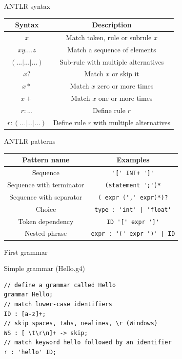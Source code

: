 \documentclass{beamer}
\begin{document}
\begin{frame}{ANTLR syntax}
	\begin{table}[H]
		\begin{tabular}{c|c}
			\textbf{Syntax} & \textbf{Description} \\
			\hline
			$x$ & Match token, rule or subrule $x$ \\
			$x y ....z$ & Match a sequence of elements \\
			$(...|...|...)$ & Sub-rule with multiple alternatives \\
			$x?$ & Match $x$ or skip it \\
			$x*$ & Match $x$ zero or more times \\
			$x+$ & Match $x$ one or more times \\
			$r: ...$ & Define rule $r$ \\
			$r: (...|...|...)$ & Define rule $r$ with multiple alternatives
		\end{tabular}
	\end{table}
\end{frame}

\begin{frame}[fragile]{ANTLR patterns}
	\begin{table}[H]
		\begin{tabular}{c|c}
			\textbf{Pattern name} & \textbf{Examples} \\
			\hline
			Sequence & \verb|'[' INT+ ']'|\\
			Sequence with terminator & \verb|(statement ';')*| \\
			Sequence with separator & \verb|( expr (',' expr)*)?| \\
			Choice & \verb^type : 'int' | 'float'^\\
			Token dependency & \verb|ID '[' expr ']'| \\
			Nested phrase & \verb^expr : '(' expr ')' | ID^
		\end{tabular}
	\end{table}
\end{frame}

\begin{frame}[fragile]{First grammar}
	\begin{exampleblock}{Simple grammar (Hello.g4)}
		\begin{verbatim}
// define a grammar called Hello
grammar Hello;
// match lower-case identifiers
ID : [a-z]+;
// skip spaces, tabs, newlines, \r (Windows)
WS : [ \t\r\n]+ -> skip;
// match keyword hello followed by an identifier
r : 'hello' ID;
		\end{verbatim}
	\end{exampleblock}
\end{frame}
\end{document}
